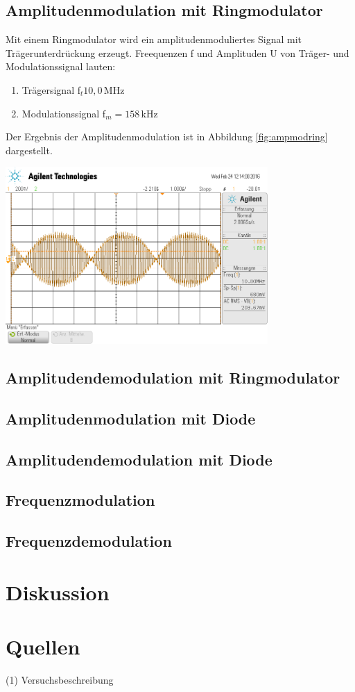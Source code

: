 \documentclass[]{scrartcl}
\begin{document}
\subsection{Amplitudenmodulation mit Ringmodulator}
Mit einem Ringmodulator wird ein amplitudenmoduliertes Signal mit Trägerunterdrückung erzeugt. Freequenzen f und Amplituden U von Träger- und Modulationssignal lauten:
\begin{enumerate}
	\item Trägersignal f$_t10,0$\,MHz
	\item Modulationssignal f$_m=158$\,kHz
\end{enumerate}
Der Ergebnis der Amplitudenmodulation ist in Abbildung \ref{fig:ampmodring} dargestellt.
\begin{center}
	\includegraphics[width=10cm]{images/ampmodring.png}
	\label{fig:ampmodring}
\end{center}

\subsection{Amplitudendemodulation mit Ringmodulator}

\subsection{Amplitudenmodulation mit Diode}

\subsection{Amplitudendemodulation mit Diode}

\subsection{Frequenzmodulation}

\subsection{Frequenzdemodulation}

\section{Diskussion}

\section{Quellen}
(1) Versuchsbeschreibung
\end{document}
